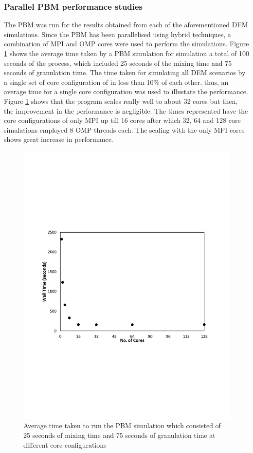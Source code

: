 \documentclass[preprint,11pt,authoryear]{elsarticle}
\begin{document}
\subsubsection{Parallel PBM performance studies}
\par The PBM was run for the results obtained from each of the aforementioned DEM simulations. Since the PBM has been parallelised using hybrid techniques, a combination of MPI and OMP cores were used to perform the simulations. Figure \ref{fig:rslts_PBM_timing_studies} shows the average time taken by a PBM simulation for simulation a total of 100 seconds of the process, which included 25 seconds of the mixing time and 75 seconds of granulation time. The time taken for simulating all DEM scenarios by a single set of core configuration of in less than 10\% of each other, thus, an  average time for a single core configuration was used to illustate the performance. Figure \ref{fig:rslts_PBM_timing_studies} shows that the program scales really well to about 32 cores but then, the improvement in the performance is negligible. The times represented have the core configurations of only MPI up till 16 cores after which 32, 64 and 128 core simulations employed 8 OMP threads each. The scaling with the only MPI cores shows great increase in performance. \\
\begin{figure}[H]
\centering
\includegraphics[scale=0.7]{rslts_PBM_Time_analysis.pdf}
\caption{Average time taken to run the PBM simulation which consisted of 25 seconds of mixing time and 75 seconds of granulation time at different core configurations}
\label{fig:rslts_PBM_timing_studies}
\end{figure}
\end{document}
